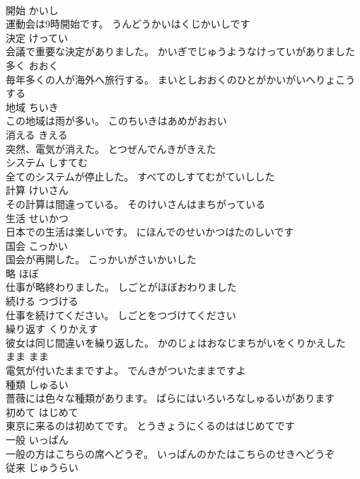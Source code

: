 \documentclass[8pt]{extreport}
\begin{document}
\begin{CJK}{UTF8}{min}
\\	開始	かいし	
\\	運動会は9時開始です。	うんどうかいはくじかいしです	
\\	決定	けってい	
\\	会議で重要な決定がありました。	かいぎでじゅうようなけっていがありました	
\\	多く	おおく	
\\	毎年多くの人が海外へ旅行する。	まいとしおおくのひとがかいがいへりょこうする	
\\	地域	ちいき	
\\	この地域は雨が多い。	このちいきはあめがおおい	
\\	消える	きえる	
\\	突然、電気が消えた。	とつぜんでんきがきえた	
\\	システム	しすてむ	
\\	全てのシステムが停止した。	すべてのしすてむがていしした	
\\	計算	けいさん	
\\	その計算は間違っている。	そのけいさんはまちがっている	
\\	生活	せいかつ	
\\	日本での生活は楽しいです。	にほんでのせいかつはたのしいです	
\\	国会	こっかい	
\\	国会が再開した。	こっかいがさいかいした	
\\	略	ほぼ	
\\	仕事が略終わりました。	しごとがほぼおわりました	
\\	続ける	つづける	
\\	仕事を続けてください。	しごとをつづけてください	
\\	繰り返す	くりかえす	
\\	彼女は同じ間違いを繰り返した。	かのじょはおなじまちがいをくりかえした	
\\	まま	まま	
\\	電気が付いたままですよ。	でんきがついたままですよ	
\\	種類	しゅるい	
\\	薔薇には色々な種類があります。	ばらにはいろいろなしゅるいがあります	
\\	初めて	はじめて	
\\	東京に来るのは初めてです。	とうきょうにくるのははじめてです	
\\	一般	いっぱん	
\\	一般の方はこちらの席へどうぞ。	いっぱんのかたはこちらのせきへどうぞ	
\\	従来	じゅうらい	

\end{CJK}
\end{document}
